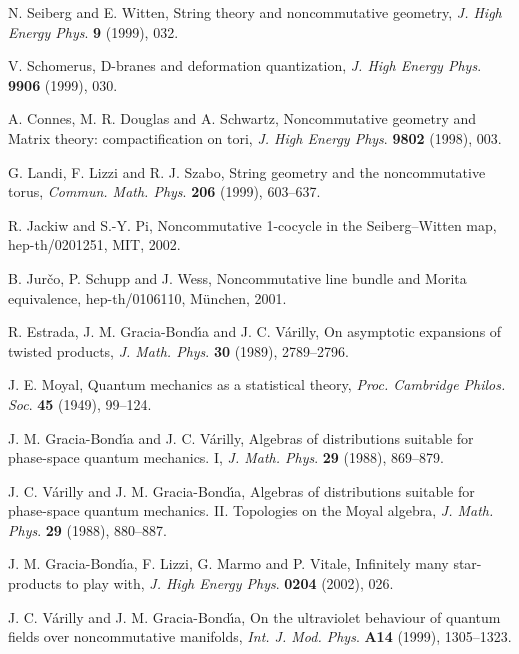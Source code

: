 \documentclass[a4paper,12pt]{article}
\providecommand{\1}{\mathbf{1}}         %
\providecommand{\7}{\dagger}            %
\providecommand{\8}{\bullet}            %
\renewcommand{\.}{\cdot}            %
\renewcommand{\:}{\colon}           %
\begin{document}
\begin{thebibliography}{74}
N. Seiberg and E. Witten,
String theory and noncommutative geometry,
\textit{J. High Energy Phys}. {\bf 9} (1999), 032.

V. Schomerus,
D-branes and deformation quantization,
\textit{J. High Energy Phys}. {\bf 9906} (1999), 030.

A. Connes, M. R. Douglas and A. Schwartz,
Noncommutative geometry and Matrix theory:
compactification on tori,
\textit{J. High Energy Phys}. {\bf 9802} (1998), 003.

G. Landi, F. Lizzi and R. J. Szabo,
String geometry and the noncommutative torus,
\textit{Commun. Math. Phys}. {\bf 206} (1999), 603--637.

R. Jackiw and S.-Y. Pi,
Noncommutative 1-cocycle in the Seiberg--Witten map,
hep-th/0201251, MIT, 2002.

B. Jur\v{c}o, P. Schupp and J. Wess,
Noncommutative line bundle and Morita equivalence,
hep-th/0106110, M\"unchen, 2001.

R. Estrada, J. M. Gracia-Bond\'{\i}a and J. C. V\'arilly,
On asymptotic expansions of twisted products,
\textit{J. Math. Phys}. {\bf 30} (1989), 2789--2796.

J. E. Moyal,
Quantum mechanics as a statistical theory,
\textit{Proc. Cambridge Philos. Soc}. {\bf 45} (1949), 99--124.

J. M. Gracia-Bond{\'\i}a and J. C. V\'arilly,
Algebras of distributions suitable for phase-space quantum
mechanics. I,
\textit{J. Math. Phys}. {\bf 29} (1988), 869--879.

J. C. V\'arilly and J. M. Gracia-Bond{\'\i}a,
Algebras of distributions suitable for phase-space quantum
mechanics. II. Topologies on the Moyal algebra,
\textit{J. Math. Phys}. {\bf 29} (1988), 880--887.

J. M. Gracia-Bond\'{\i}a, F. Lizzi, G. Marmo and P. Vitale,
Infinitely many star-products to play with,
\textit{J. High Energy Phys}. {\bf 0204} (2002), 026.

J. C. V\'arilly and J. M. Gracia-Bond\'{\i}a,
On the ultraviolet behaviour of quantum fields over noncommutative
manifolds,
\textit{Int. J. Mod. Phys}. {\bf A14} (1999), 1305--1323.


\end{thebibliography}
\end{document}
